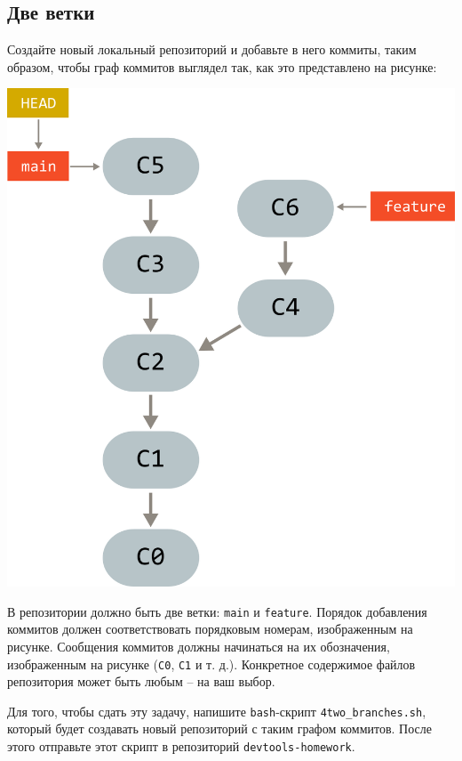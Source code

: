 \documentclass{article}
\begin{document}
\subsection{Две ветки}
Создайте новый локальный репозиторий и добавьте в него коммиты, таким образом, чтобы граф коммитов выглядел так, как это представлено на рисунке:
\begin{center}
\includegraphics[scale=0.85]{../images/two_branches.png}
\end{center}
В репозитории должно быть две ветки: \texttt{main} и \texttt{feature}. Порядок добавления коммитов должен соответствовать порядковым номерам, изображенным на рисунке. Сообщения коммитов должны начинаться на их обозначения, изображенным на рисунке (\texttt{C0}, \texttt{С1} и т. д.). Конкретное содержимое файлов репозитория может быть любым -- на ваш выбор. 

\noindent Для того, чтобы сдать эту задачу, напишите \texttt{bash}-скрипт \texttt{4two\_branches.sh}, который будет создавать новый репозиторий с таким графом коммитов. После этого отправьте этот скрипт в репозиторий \texttt{devtools-homework}.
\end{document}
